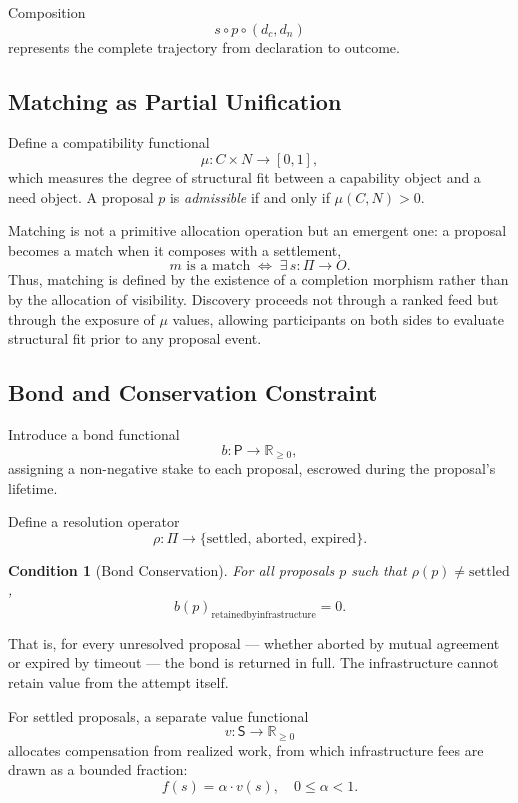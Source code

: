 \documentclass[12pt, a4paper]{article}
\newtheorem{condition}{Condition}
\begin{document}
Composition
\[
s \circ p \circ (d_c, d_n)
\]
represents the complete trajectory from declaration to outcome.

\subsection{Matching as Partial Unification}

Define a compatibility functional
\[
\mu : C \times N \to [0,1],
\]
which measures the degree of structural fit between a capability object and a
need object. A proposal $p$ is \emph{admissible} if and only if $\mu(C,N) > 0$.

Matching is not a primitive allocation operation but an emergent one: a proposal
becomes a match when it composes with a settlement,
\[
m \text{ is a match} \;\iff\; \exists\, s : \Pi \to O.
\]
Thus, matching is defined by the existence of a completion morphism rather than
by the allocation of visibility. Discovery proceeds not through a ranked feed
but through the exposure of $\mu$ values, allowing participants on both sides
to evaluate structural fit prior to any proposal event.

\subsection{Bond and Conservation Constraint}

Introduce a bond functional
\[
b : \mathsf{P} \to \mathbb{R}_{\ge 0},
\]
assigning a non-negative stake to each proposal, escrowed during the proposal's
lifetime.

Define a resolution operator
\[
\rho : \Pi \to \{\mathrm{settled},\, \mathrm{aborted},\, \mathrm{expired}\}.
\]

\begin{condition}[Bond Conservation]
For all proposals $p$ such that $\rho(p) \neq \mathrm{settled}$,
\[
b(p)_{\mathrm{retained by infrastructure}} = 0.
\]
\end{condition}

That is, for every unresolved proposal --- whether aborted by mutual agreement
or expired by timeout --- the bond is returned in full. The infrastructure
cannot retain value from the attempt itself.

For settled proposals, a separate value functional
\[
v : \mathsf{S} \to \mathbb{R}_{\ge 0}
\]
allocates compensation from realized work, from which infrastructure fees are
drawn as a bounded fraction:
\[
f(s) = \alpha \cdot v(s), \quad 0 \le \alpha < 1.
\]
\end{document}
